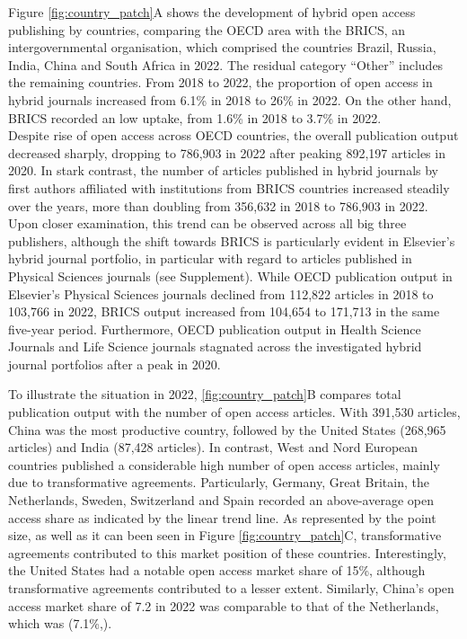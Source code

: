 \documentclass[a4paper,man,floatsintext,longtable,noextraspace,12pt]{apa6}
\begin{document}
Figure \ref{fig:country_patch}A shows the development of hybrid open
access publishing by countries, comparing the OECD area with the BRICS,
an intergovernmental organisation, which comprised the countries Brazil,
Russia, India, China and South Africa in 2022. The residual category
``Other'' includes the remaining countries. From 2018 to 2022, the
proportion of open access in hybrid journals increased from 6.1\% in
2018 to 26\% in 2022. On the other hand, BRICS recorded an low uptake,
from 1.6\% in 2018 to 3.7\% in 2022.\\
Despite rise of open access across OECD countries, the overall
publication output decreased sharply, dropping to 786,903 in 2022 after
peaking 892,197 articles in 2020. In stark contrast, the number of
articles published in hybrid journals by first authors affiliated with
institutions from BRICS countries increased steadily over the years,
more than doubling from 356,632 in 2018 to 786,903 in 2022. Upon closer
examination, this trend can be observed across all big three publishers,
although the shift towards BRICS is particularly evident in Elsevier's
hybrid journal portfolio, in particular with regard to articles
published in Physical Sciences journals (see Supplement). While OECD
publication output in Elsevier's Physical Sciences journals declined
from 112,822 articles in 2018 to 103,766 in 2022, BRICS output increased
from 104,654 to 171,713 in the same five-year period. Furthermore, OECD
publication output in Health Science Journals and Life Science journals
stagnated across the investigated hybrid journal portfolios after a peak
in 2020.

To illustrate the situation in 2022, \ref{fig:country_patch}B compares
total publication output with the number of open access articles. With
391,530 articles, China was the most productive country, followed by the
United States (268,965 articles) and India (87,428 articles). In
contrast, West and Nord European countries published a considerable high
number of open access articles, mainly due to transformative agreements.
Particularly, Germany, Great Britain, the Netherlands, Sweden,
Switzerland and Spain recorded an above-average open access share as
indicated by the linear trend line. As represented by the point size, as
well as it can been seen in Figure \ref{fig:country_patch}C,
transformative agreements contributed to this market position of these
countries. Interestingly, the United States had a notable open access
market share of 15\%, although transformative agreements contributed to
a lesser extent. Similarly, China's open access market share of 7.2 in
2022 was comparable to that of the Netherlands, which was (7.1\%,).
\end{document}
